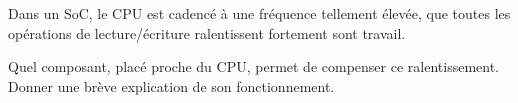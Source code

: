 \documentclass[svgnames,11pt]{beamer}
\begin{document}
\begin{frame}
    \frametitle{}

    Dans un SoC, le CPU est cadencé à une fréquence tellement élevée, que toutes les opérations de lecture/écriture ralentissent fortement sont travail.
    \begin{activite}
    Quel composant, placé proche du CPU, permet de compenser ce ralentissement. Donner une brève explication de son fonctionnement.
    \end{activite}
\end{frame}
\end{document}
